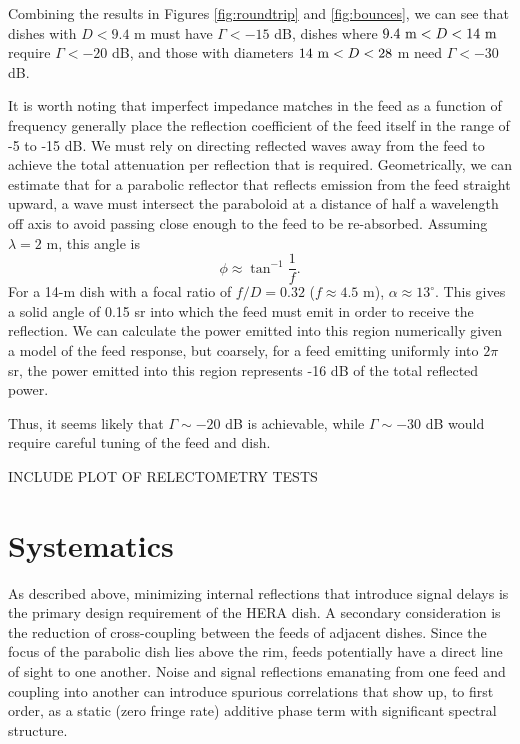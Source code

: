 \documentclass[11pt]{article}
\begin{document}
Combining the results in Figures \ref{fig:roundtrip} and \ref{fig:bounces},
we can see that dishes with $D<9.4$ m must have $\Gamma<-15$ dB, dishes
where $9.4~{\rm m}<D<14~{\rm m}$ require $\Gamma<-20$ dB, and those with
diameters $14~{\rm m}<D<28$ m need $\Gamma<-30$ dB.

It is worth noting that imperfect impedance matches in the feed as a function
of frequency generally place the reflection coefficient of the feed itself
in the range of -5 to -15 dB. We must rely on directing reflected
waves away from the feed to achieve the total attenuation per reflection
that is required.  Geometrically, we can estimate that for a parabolic reflector that
reflects emission from the feed straight upward, a wave must intersect the paraboloid
at a distance of half a wavelength off axis to avoid
passing close enough to the feed to be re-absorbed.  Assuming $\lambda=2$ m, this angle is 
\begin{equation}
\phi\approx\tan^{-1}\frac{1}{f}.
\end{equation}
For a 14-m dish with a focal ratio of $f/D=0.32$ ($f\approx4.5$ m), $\alpha\approx13^\circ$.
This gives a solid angle of 0.15 sr into which the feed must emit in order to receive the reflection.
We can calculate the power emitted into this region numerically given a model of the feed response,
but coarsely, for a feed emitting uniformly into $2\pi$ sr, the power emitted into this region
represents -16 dB of the total reflected power.  

Thus, it seems likely that $\Gamma\sim-20$ dB is achievable, while $\Gamma\sim-30$ dB
would require careful tuning of the feed and dish.

INCLUDE PLOT OF RELECTOMETRY TESTS

\section{Systematics}

As described above, minimizing internal reflections that introduce signal delays is
the primary design requirement of the HERA dish.  A secondary consideration is the
reduction of cross-coupling between the feeds of adjacent dishes.  Since the focus of
the parabolic dish lies above the rim, feeds potentially have a direct line of sight to
one another.  Noise and signal reflections emanating from one feed and coupling into another
can introduce spurious correlations that show up, to first order, as a static (zero fringe rate) additive
phase term with significant spectral structure.  
\end{document}
